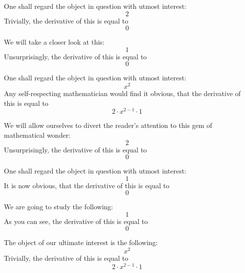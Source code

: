 \documentclass{article}
\begin{document}
One shall regard the object in question with utmost interest:
\begin{equation}
2 
\end{equation}
Trivially, the derivative of this is equal to
\begin{equation}
0 
\end{equation}

We will take a closer look at this:
\begin{equation}
1 
\end{equation}
Unsurprisingly, the derivative of this is equal to
\begin{equation}
0 
\end{equation}

One shall regard the object in question with utmost interest:
\begin{equation}
x ^{2 } 
\end{equation}
Any self-respecting mathematician would find it obvious, that the derivative of this is equal to
\begin{equation}
2 \cdot x ^{2 - 1 } \cdot 1 
\end{equation}

We will allow ourselves to divert the reader's attention to this gem of mathematical wonder:
\begin{equation}
2 
\end{equation}
Unsurprisingly, the derivative of this is equal to
\begin{equation}
0 
\end{equation}

One shall regard the object in question with utmost interest:
\begin{equation}
1 
\end{equation}
It is now obvious, that the derivative of this is equal to
\begin{equation}
0 
\end{equation}

We are going to study the following:
\begin{equation}
1 
\end{equation}
As you can see, the derivative of this is equal to
\begin{equation}
0 
\end{equation}

The object of our ultimate interest is the following:
\begin{equation}
x ^{2 } 
\end{equation}
Trivially, the derivative of this is equal to
\begin{equation}
2 \cdot x ^{2 - 1 } \cdot 1 
\end{equation}
\end{document}
